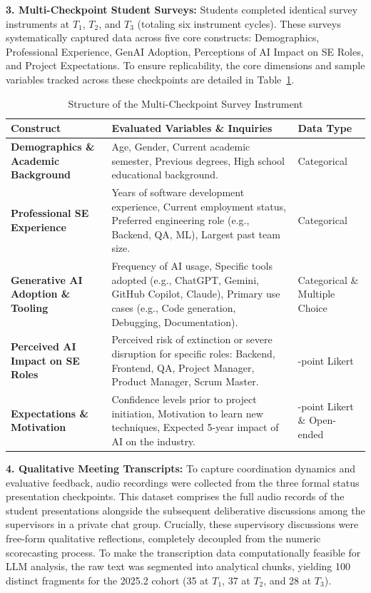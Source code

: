 \documentclass[conference]{IEEEtran}
\begin{document}
\textbf{3. Multi-Checkpoint Student Surveys:} Students completed identical survey instruments at $T_1$, $T_2$, and $T_3$ (totaling six instrument cycles). These surveys systematically captured data across five core constructs: Demographics, Professional Experience, GenAI Adoption, Perceptions of AI Impact on SE Roles, and Project Expectations. To ensure replicability, the core dimensions and sample variables tracked across these checkpoints are detailed in Table~\ref{tab:survey_instrument}.

\begin{table}[t]
\caption{Structure of the Multi-Checkpoint Survey Instrument}
\label{tab:survey_instrument}
\centering
\begin{tabularx}{\textwidth}{@{}>{\raggedright\arraybackslash}p{3.5cm}>{\raggedright\arraybackslash}X>{\raggedright\arraybackslash}p{2.5cm}@{}}
\toprule
\textbf{Construct} & \textbf{Evaluated Variables \& Inquiries} & \textbf{Data Type} \\
\midrule
\textbf{Demographics \& Academic Background} & Age, Gender, Current academic semester, Previous degrees, High school educational background. & Categorical \\
\addlinespace
\textbf{Professional SE Experience} & Years of software development experience, Current employment status, Preferred engineering role (e.g., Backend, QA, ML), Largest past team size. & Categorical \\
\addlinespace
\textbf{Generative AI Adoption \& Tooling} & Frequency of AI usage, Specific tools adopted (e.g., ChatGPT, Gemini, GitHub Copilot, Claude), Primary use cases (e.g., Code generation, Debugging, Documentation). & Categorical \& Multiple Choice \\
\addlinespace
\textbf{Perceived AI Impact on SE Roles} & Perceived risk of extinction or severe disruption for specific roles: Backend, Frontend, QA, Project Manager, Product Manager, Scrum Master. & 5-point Likert \\
\addlinespace
\textbf{Expectations \& Motivation} & Confidence levels prior to project initiation, Motivation to learn new techniques, Expected 5-year impact of AI on the industry. & 5-point Likert \& Open-ended \\
\bottomrule
\end{tabularx}
\end{table}

\textbf{4. Qualitative Meeting Transcripts:} To capture coordination dynamics and evaluative feedback, audio recordings were collected from the three formal status presentation checkpoints. This dataset comprises the full audio records of the student presentations alongside the subsequent deliberative discussions among the supervisors in a private chat group. Crucially, these supervisory discussions were free-form qualitative reflections, completely decoupled from the numeric scorecasting process. To make the transcription data computationally feasible for LLM analysis, the raw text was segmented into analytical chunks, yielding 100 distinct fragments for the 2025.2 cohort (35 at $T_1$, 37 at $T_2$, and 28 at $T_3$).
\end{document}
